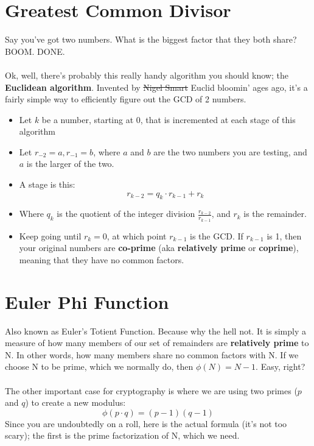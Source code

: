     \section{Greatest Common Divisor}
    Say you've got two numbers. What is the biggest factor that they both share? BOOM. DONE.\\
    \\
    Ok, well, there's probably this really handy algorithm you should know; the \textbf{Euclidean algorithm}. Invented by \sout{Nigel Smart} Euclid bloomin' ages ago, it's a fairly simple way to efficiently figure out the GCD of 2 numbers.
        \begin{itemize}
            \item Let $k$ be a number, starting at 0, that is incremented at each stage of this algorithm
            \item Let $r_{-2} = a, r_{-1} = b$, where $a$ and $b$ are the two numbers you are testing, and $a$ is the larger of the two.
            \item A stage is this: 
                $$
                    r_{k-2} = q_{k} \cdot r_{k-1} + r_{k}
                $$
            \item Where $q_{k}$ is the quotient of the integer division $\frac{r_{k-2}}{r_{k-1}}$, and $r_{k}$ is the remainder.
            \item Keep going until $r_{k} = 0$, at which point $r_{k-1}$ is the GCD. If $r_{k-1}$ is 1, then your original numbers are \textbf{co-prime} (aka \textbf{relatively prime} or \textbf{coprime}), meaning that they have no common factors.
        \end{itemize}
    
    \section{Euler Phi Function}
    Also known as Euler's Totient Function. Because why the hell not. It is simply a measure of how many members of our set of remainders are \textbf{relatively prime} to N. In other words, how many members share no common factors with N. If we choose N to be prime, which we normally do, then $\phi(N) = N - 1$. Easy, right?\\
    \\
    The other important case for cryptography is where we are using two primes ($p$ and $q$) to create a new modulus:
    $$ \phi(p \cdot q) = (p-1)(q-1)$$
    Since you are undoubtedly on a roll, here is the actual formula (it's not too scary); the first is the prime factorization of N, which we need.

